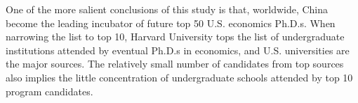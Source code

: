 \documentclass[12pt]{article}
\begin{document}
One of the more salient conclusions of this study is that, worldwide, China become the leading incubator of future top 50 U.S. economics Ph.D.s. When narrowing the list to top 10, Harvard University tops the list of undergraduate
institutions attended by eventual Ph.D.s in economics, and U.S. universities are the major sources. The relatively small number of candidates from top sources also implies the little concentration of undergraduate schools attended by top 10 program candidates.

\clearpage
\begin{singlespace}
%
%


\end{singlespace}


\newpage
\appendix
\setcounter{table}{0}
\renewcommand{\tablename}{Appendix Table}
\renewcommand{\figurename}{Appendix Figure}
\renewcommand{\thetable}{A\arabic{table}}
\setcounter{figure}{0}
\renewcommand{\thefigure}{A\arabic{figure}}
\end{document}
